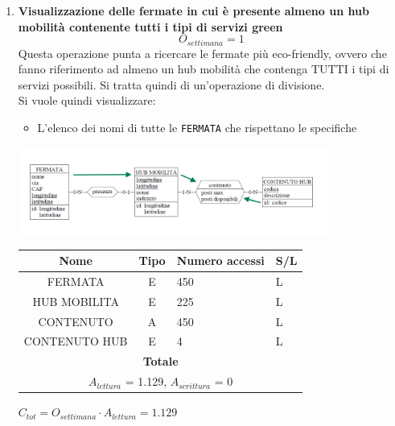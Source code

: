 \documentclass[12pt,a4paper]{report}
\begin{document}
\begin{enumerate}[label=\textbf{\arabic*)}]
    \item\textbf{Visualizzazione delle fermate in cui è presente almeno un hub mobilità contenente tutti i tipi di servizi green} \label{op18} \\
    \[ {O_{settimana} = 1} \]
    Questa operazione punta a ricercare le fermate più eco-friendly, ovvero che fanno riferimento ad almeno un hub mobilità che contenga TUTTI i tipi di servizi possibili. Si tratta quindi di un'operazione di divisione. \\
    Si vuole quindi visualizzare:
    \begin{itemize}
	\renewcommand\labelitemi{--}
    \item L'elenco dei nomi di tutte le \texttt{FERMATA} che rispettano le specifiche
    \end{itemize}
    \begin{center}
    \includegraphics[width=0.8\textwidth]{VisualFermateHubCompleti}
    \end{center}
    \begin{table}[H]
    \centering
    \begin{tabular}{|c|c|l|l|}
    \hline
    \textbf{Nome} & \textbf{Tipo} & \textbf{Numero accessi} & \textbf{S/L} \\
    \hline
    FERMATA & E & 450 & L \\
    \hline
    HUB MOBILITA & E & 225 & L \\
    \hline
    CONTENUTO & A & 450 & L \\
    \hline
    CONTENUTO HUB & E & 4 & L \\
    \hline
    \multicolumn{4}{c}{\textbf{Totale}} \\
    \multicolumn{4}{c}{${A_{lettura}}$ = 1.129, ${A_{scrittura}}$ = 0} \\
    \hline
    \end{tabular}
    \end{table}
    \begin{center}
    ${C_{tot} = {O_{settimana}}\cdot{A_{lettura}}= 1.129}$
    \end{center}



\end{enumerate}
\end{document}
